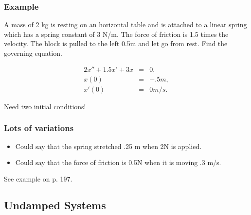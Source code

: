 \begin{frame}
  \frametitle{Example}

  A mass of 2 kg is resting on an horizontal table and is attached to
  a linear spring which has a spring constant of 3 N/m. The force of
  friction is 1.5 times the velocity. The block is pulled to the left
  0.5m and let go from rest. Find the governing equation.

  {
    \begin{eqnarray*}
      2 x'' + 1.5 x' + 3x & = & 0, \\
      x(0) & = & -.5m, \\
      x'(0) & = & 0 m/s.
    \end{eqnarray*}

    Need two initial conditions!
  }

\end{frame}


\begin{frame}
  \frametitle{Lots of variations}

  \begin{itemize}
  \item Could say that the spring stretched .25 m when 2N is applied.
  \item Could say that the force of friction is 0.5N when it is moving
    .3 m/s.
  \end{itemize}

  See example on p. 197.

\end{frame}

\subsection{Undamped Systems}

